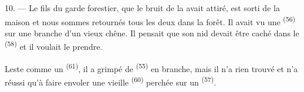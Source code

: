 10. --- Le fils du garde forestier, que le bruit de la 
avait attiré, est sorti de la maison et nous sommes retournés tous les deux dans
la forêt. Il avait vu une  \textsuperscript{(56)} sur une branche
d'un vieux chêne. Il pensait que son nid devait être caché dans le
 \textsuperscript{(58)} et il voulait le prendre.

Leste comme un  \textsuperscript{(61)}, il a grimpé de
 \textsuperscript{(55)} en branche, mais il n'a rien trouvé et
n'a réussi qu'à faire envoler une vieille 
\textsuperscript{(60)} perchée sur un  \textsuperscript{(57)}.
\VUsaut{4.0mm}
\VUfilet{22mm}
